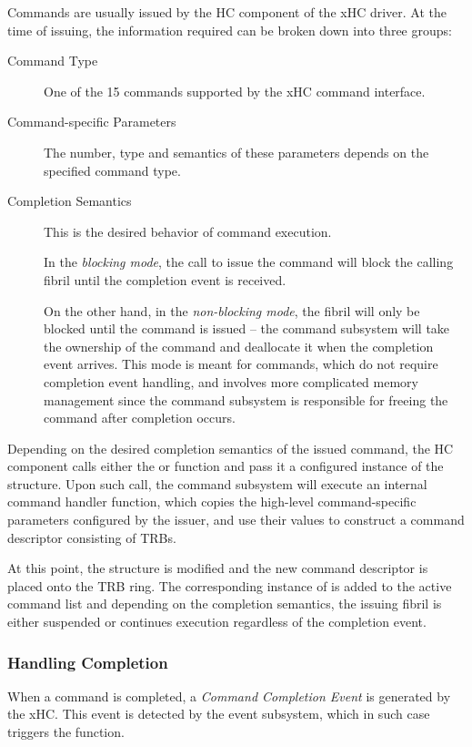 Commands are usually issued by the HC component of the xHC driver. At the time
of issuing, the information required can be broken down into three groups:
~
\begin{description}
	\item[Command Type]
		One of the 15 commands supported by the xHC command interface.
	\item[Command-specific Parameters]
		The number, type and semantics of these parameters depends on the
		specified command type.
	\item[Completion Semantics]
		This is the desired behavior of command execution.
		
		In the \textit{blocking mode}, the call to issue the command will block
		the calling fibril until the completion event is received.
		
		On the other hand, in the \textit{non-blocking mode}, the fibril will
		only be blocked until the command is issued -- the command subsystem
		will take the ownership of the command and deallocate it when the
		completion event arrives. This mode is meant for commands, which do not
		require completion event handling, and involves more complicated memory
		management since the command subsystem is responsible for freeing the
		command after completion occurs.
\end{description}

Depending on the desired completion semantics of the issued command, the HC
component calls either the  or 
function and pass it a configured instance of the  structure.
Upon such call, the command subsystem will execute an internal command handler
function, which copies the high-level command-specific parameters configured by
the issuer, and use their values to construct a command descriptor consisting of
TRBs.

At this point, the  structure is modified and the new
command descriptor is placed onto the TRB ring. The corresponding instance of
 is added to the active command list and depending on the
completion semantics, the issuing fibril is either suspended or continues
execution regardless of the completion event.


\subsubsection{Handling Completion}

When a command is completed, a \textit{Command Completion Event} is generated by
the xHC. This event is detected by the event subsystem, which in such case
triggers the  function.


